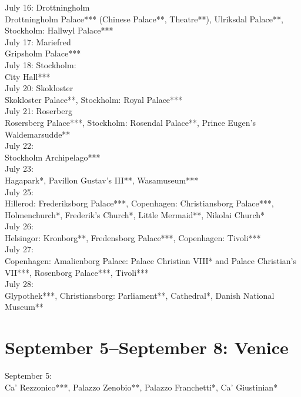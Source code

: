 July 16: Drottningholm\\
Drottningholm Palace*** (Chinese Palace**, Theatre**), Ulriksdal Palace**, Stockholm: Hallwyl Palace***\\

July 17: Mariefred\\
Gripsholm Palace***\\

July 18: Stockholm:\\
City Hall***\\

July 20: Skokloster\\
Skokloster Palace**, Stockholm: Royal Palace***\\

July 21: Roserberg\\
Rosersberg Palace***, Stockholm: Rosendal Palace**, Prince Eugen's Waldemarsudde**\\

July 22:\\
Stockholm Archipelago***\\

July 23:\\
Hagapark*, Pavillon Gustav's III**, Wasamuseum***\\

July 25:\\
Hillerod: Frederiksborg Palace***, Copenhagen: Christiansborg Palace***, Holmenchurch*, Frederik's Church*, Little Mermaid**, Nikolai Church*\\

July 26:\\
Helsingor: Kronborg**, Fredensborg Palace***, Copenhagen: Tivoli***\\

July 27:\\
Copenhagen: Amalienborg Palace: Palace Christian VIII* and Palace Christian's VII***, Rosenborg Palace***, Tivoli***\\

July 28:\\
Glypothek***, Christiansborg: Parliament**, Cathedral*, Danish National Museum**

\section{September 5--September 8: Venice}
\label{Venice2013}

September 5:\\
Ca' Rezzonico***, Palazzo Zenobio**, Palazzo Franchetti*, Ca' Giustinian*\\

